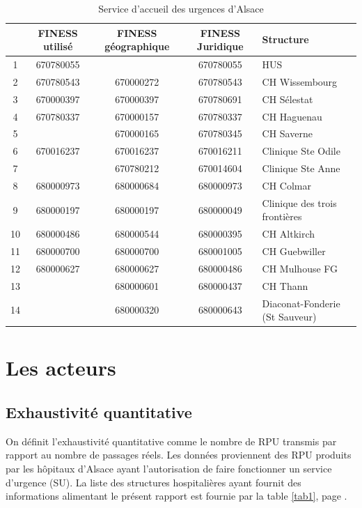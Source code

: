 \documentclass[12pt,english,french,twoside]{book}\usepackage[]{graphicx}\usepackage[]{color}
\begin{document}
\begin{table}
\begin{center}
\begin{tabular}{|c|c|c|c|l|}
  \hline
& FINESS utilisé & FINESS géographique & FINESS Juridique & Structure \\
  \hline
  \hline
1 & 670780055 &   & 670780055 & HUS \\
2 & 670780543 & 670000272 & 670780543 & CH Wissembourg \\
3 & 670000397 & 670000397  & 670780691 & CH Sélestat \\
4 & 670780337 & 670000157 & 670780337 & CH Haguenau \\
5 &   & 670000165 & 670780345 & CH Saverne \\
6 & 670016237  & 670016237  & 670016211 & Clinique Ste Odile \\
7 &   & 670780212 & 670014604 & Clinique Ste Anne \\
8 & 680000973 & 680000684 & 680000973 & CH Colmar \\
9 & 680000197  & 680000197  & 680000049 & Clinique des trois frontières \\
10 & 680000486 & 680000544  & 680000395 & CH Altkirch \\
11 & 680000700 & 680000700 & 680001005 & CH Guebwiller \\
12 & 680000627 & 680000627 & 680000486 & CH Mulhouse FG \\
13 &   & 680000601 & 680000437 & CH Thann \\
14 &   & 680000320  & 680000643 & Diaconat-Fonderie (St Sauveur) \\
\hline
\end{tabular}
\caption{Service d'accueil des urgences d'Alsace}
\label{summary}
\end{center}
\end{table}


\newpage
\chapter{Les acteurs}



\section{Exhaustivité quantitative}



On définit l'exhaustivité quantitative comme le nombre de RPU transmis par rapport au nombre de passages réels.
Les données proviennent des RPU produits par les hôpitaux d'Alsace ayant l'autorisation de faire fonctionner un service d'urgence (SU). La liste des structures hospitalières ayant fournit des informations alimentant le présent rapport est fournie par la table \ref{tab1}, page \pageref{tab1}.
\end{document}
